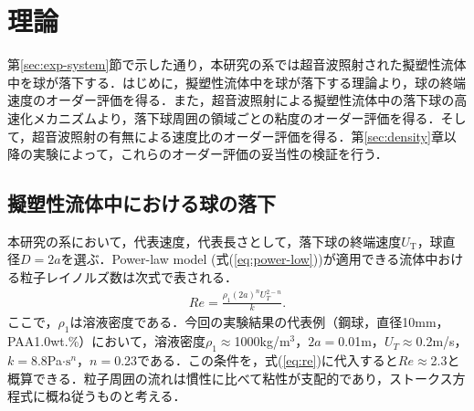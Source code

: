 \section{理論}
第\ref{sec:exp-system}節で示した通り，本研究の系では超音波照射された擬塑性流体中を球が落下する．はじめに，擬塑性流体中を球が落下する理論より，球の終端速度のオーダー評価を得る．また，超音波照射による擬塑性流体中の落下球の高速化メカニズムより，落下球周囲の領域ごとの粘度のオーダー評価を得る．そして，超音波照射の有無による速度比のオーダー評価を得る．第\ref{sec:density}章以降の実験によって，これらのオーダー評価の妥当性の検証を行う．

\subsection{擬塑性流体中における球の落下}
本研究の系において，代表速度，代表長さとして，落下球の終端速度$U_\text{T}$，球直径$D=2a$を選ぶ．Power-law model (式(\ref{eq:power-low}))が適用できる流体中おける粒子レイノルズ数は次式で表される\cite{ref:1,ref:8-5}．
\begin{eqnarray}
    Re = \frac{\rho_1 \left(2a\right)^n U_T^{2-n}}{k} .
    \label{eq:re}
\end{eqnarray}
ここで，$\rho_1$は溶液密度である．今回の実験結果の代表例（鋼球，直径10mm，PAA1.0wt.\%）において，溶液密度$\rho_1\approx$1000kg/m$^3$，$2a=$0.01m，$U_T \approx$0.2m/s，$k=$8.8Pa$\cdot \text{s}^n$，$n=$0.23である．この条件を，式(\ref{eq:re})に代入すると$Re\approx$2.3と概算できる．粒子周囲の流れは慣性に比べて粘性が支配的であり，ストークス方程式に概ね従うものと考える．

